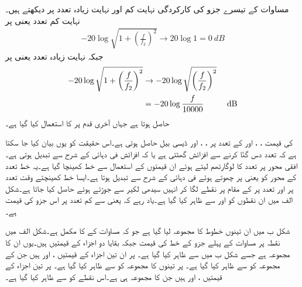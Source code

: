 مساوات  کے تیسرے جزو  کی کارکردگی نہایت کم اور نہایت زیادہ تعدد پر دیکھتے ہیں۔نہایت کم تعدد یعنی  پر
\begin{align} \label{مساوات_تعدد_ردعمل_بوڈا_کم_تعدد_تیسرا_حصہ}
-20 \log \sqrt{1+\left(\frac{f}{f_2}\right)^2} \to 20 \log 1 =\SI{0}{dB}
\end{align}
جبکہ نہایت زیادہ تعدد یعنی  پر 
\begin{gather}
\begin{aligned} \label{مساوات_تعدد_ردعمل_بوڈا_زیادہ_تعدد_تیسرا_حصہ}
-20 \log  \sqrt{1+\left(\frac{f}{f_2}\right)^2} &\to -20 \log \sqrt{\left(\frac{f}{f_2}\right)^2} \\
&=-20 \log \frac{f}{10000} \hspace{1 cm} \SI{}{dB}
\end{aligned}
\end{gather}
حاصل ہوتا ہے  جہاں آخری قدم پر  کا استعمال کیا گیا ہے۔

 کی قیمت ، ،  اور  کے تعدد پر ، ،  اور  ڈیسی بیل حاصل ہوتی ہے۔اس حقیقت کو یوں بیان کیا جا سکتا ہے کہ تعدد دس گنّا کرنے سے افزائش  گھٹتی ہے یا کہ افزائش   فی دہائی کے شرح سے تبدیل ہوتی ہے۔ افقی محور پر تعدد کا لوگارتھم لیتے ہوئے ان قیمتوں کے استعمال سے خط کھینچا گیا ہے۔یہ خط تعدد کے محور کو  یعنی  پر چھوتے ہوئے  فی دہائی کے شرح سے تبدیل ہوتا ہے۔ایسا خط کھینچتے وقت  تعدد پر  اور  تعدد پر   کے مقام پر نقطے  لگا کر انہیں سیدھی لکیر سے جوڑتے ہوئے حاصل کیا جاتا ہے۔شکل  الف  میں ان نقطوں کو  اور  سے ظاہر کیا گیا ہے۔یاد رہے کہ  یعنی  سے کم تعدد پر اس جزو کی قیمت  ہے۔

شکل  ب میں ان تینوں خطوط کا مجموعہ لیا گیا ہے جو کہ مساوات   کے  کا مکمل  ہے۔شکل  الف میں نقطہ  پر  مساوات  کے پہلے جزو کے خط کی قیمت  جبکہ بقایا دو اجزاء کے قیمتیں  ہیں۔یوں ان کا مجموعہ  ہے جسے شکل  ب میں   سے ظاہر کیا گیا ہے۔ پر ان تین اجزاء کے قیمتیں ،  اور  ہیں جن کے مجموعہ  کو  سے ظاہر کیا گیا ہے۔ پر تینوں کا مجموعہ  کو  سے ظاہر کیا گیا ہے۔ پر تین اجزاء کے قیمتیں ،  اور  ہیں جن کا مجموعہ  ہی ہے۔اس نقطے  کو  سے ظاہر کیا گیا ہے۔

